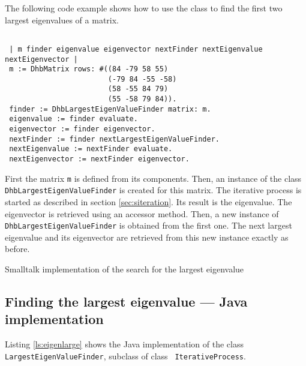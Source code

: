 \documentclass[twoside]{book}
\begin{document}
The following code example shows how to use the class to find the
first two largest eigenvalues of a matrix.
\begin{codeExample}
\begin{verbatim}

 | m finder eigenvalue eigenvector nextFinder nextEigenvalue nextEigenvector |
 m := DhbMatrix rows: #((84 -79 58 55)
                        (-79 84 -55 -58)
                        (58 -55 84 79)
                        (55 -58 79 84)).
 finder := DhbLargestEigenValueFinder matrix: m.
 eigenvalue := finder evaluate.
 eigenvector := finder eigenvector.
 nextFinder := finder nextLargestEigenValueFinder.
 nextEigenvalue := nextFinder evaluate.
 nextEigenvector := nextFinder eigenvector.
\end{verbatim}
\end{codeExample}
First the matrix {\tt m} is defined from its components. Then, an
instance of the class {\tt DhbLargestEigenValueFinder} is created
for this matrix. The iterative process is started as described in
section \ref{sec:siteration}. Its result is the eigenvalue. The
eigenvector is retrieved using an accessor method. Then, a new
instance of {\tt DhbLargestEigenValueFinder} is obtained from the
first one. The next largest eigenvalue and its eigenvector are
retrieved from this new instance exactly as before.

\begin{listing} Smalltalk implementation of the search for the largest eigenvalue
\label{ls:eigenlarge}

\end{listing}

\subsection{Finding the largest eigenvalue --- Java
implementation}\label{sec:jeigenlarge} Listing \ref{ls:eigenlarge}
shows the Java implementation of the class {\tt
LargestEigenValueFinder}, subclass of class {\tt
IterativeProcess}.
\end{document}

